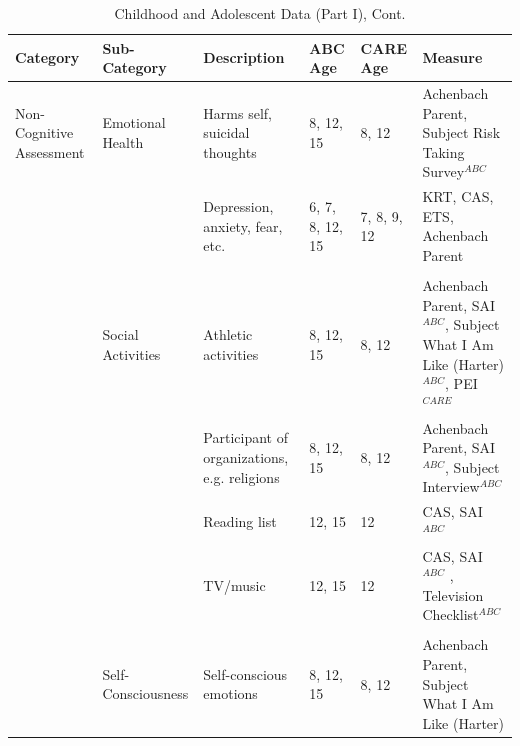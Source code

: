 \documentclass[static]{JJH-Beamer}
\begin{document}
\begin{frame}
 \addtocounter{framenumber}{-1}

\begin{table}[H]
\addtocounter{table}{-1}
\caption{Childhood and Adolescent Data (Part I), Cont.}
\begin{center}
\begin{tiny}
\begin{tabular}{L{1.2cm} C{1.4cm} C{2.3cm} C{1cm} C{1cm} C{2.7cm}}
\toprule
\textbf{Category}	&	\textbf{Sub-Category}	&	\textbf{Description}	&	\textbf{ABC Age}  	&  \textbf{CARE Age}  & 	\textbf{Measure}	\\ \midrule
Non-Cognitive Assessment	&	Emotional Health	&	Harms self, suicidal thoughts	&	8, 12, 15	&	8, 12	 	&	Achenbach Parent,  Subject Risk Taking Survey$^{ABC}$		\\
	&		&	Depression, anxiety, fear, etc.	&	6, 7, 8, 12, 15	&	7, 8, 9, 12	&	KRT, CAS, ETS,  Achenbach Parent	\\
	&	\\
	&	Social Activities	&	Athletic activities	&	8, 12, 15	&	8, 12		&	Achenbach Parent, SAI$^{ABC}$, Subject What I Am Like (Harter)$^{ABC}$, PEI$^{CARE}$	\\
	&		&	Participant of organizations, e.g. religions	&	8, 12, 15	&	8, 12	&	Achenbach Parent, SAI$^{ABC}$, Subject Interview$^{ABC}$	\\
	&		&	Reading list	&	12, 15	&	12	&	CAS, SAI$^{ABC}$	 \\
	&		&	TV/music	&	12, 15	&	12	&	CAS, SAI$^{ABC}$	, Television Checklist$^{ABC}$		\\
	&	\\
	&	Self-Consciousness	&	Self-conscious emotions	&	8, 12, 15	&	8, 12	&	Achenbach Parent, Subject What I Am Like (Harter)	\\ \bottomrule
\end{tabular}
\end{tiny}
\end{center}
\end{table}

\end{frame}
\end{document}
